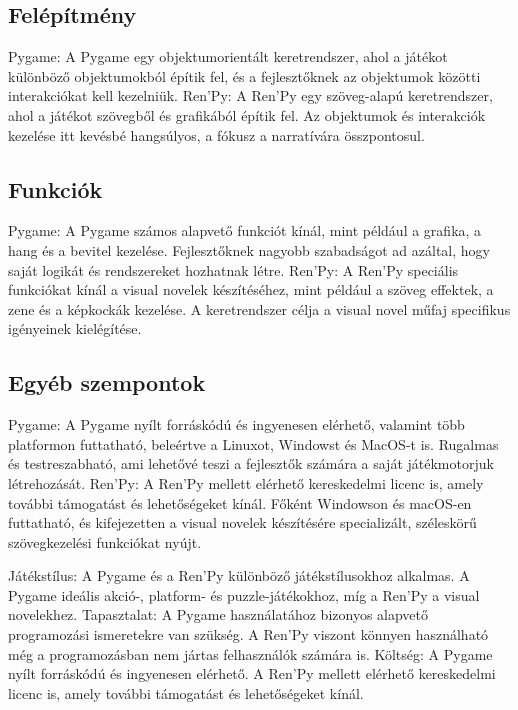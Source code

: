 \subsection{Felépítmény}

Pygame: A Pygame egy objektumorientált keretrendszer, ahol a játékot különböző objektumokból építik fel, és a fejlesztőknek az objektumok közötti interakciókat kell kezelniük.
Ren'Py: A Ren'Py egy szöveg-alapú keretrendszer, ahol a játékot szövegből és grafikából építik fel. Az objektumok és interakciók kezelése itt kevésbé hangsúlyos, a fókusz a narratívára összpontosul.

\subsection{Funkciók}

Pygame: A Pygame számos alapvető funkciót kínál, mint például a grafika, a hang és a bevitel kezelése. Fejlesztőknek nagyobb szabadságot ad azáltal, hogy saját logikát és rendszereket hozhatnak létre.
Ren'Py: A Ren'Py speciális funkciókat kínál a visual novelek készítéséhez, mint például a szöveg effektek, a zene és a képkockák kezelése. A keretrendszer célja a visual novel műfaj specifikus igényeinek kielégítése.

\subsection{Egyéb szempontok}

Pygame: A Pygame nyílt forráskódú és ingyenesen elérhető, valamint több platformon futtatható, beleértve a Linuxot, Windowst és MacOS-t is. Rugalmas és testreszabható, ami lehetővé teszi a fejlesztők számára a saját játékmotorjuk létrehozását.
Ren'Py: A Ren'Py mellett elérhető kereskedelmi licenc is, amely további támogatást és lehetőségeket kínál. Főként Windowson és macOS-en futtatható, és kifejezetten a visual novelek készítésére specializált, széleskörű szövegkezelési funkciókat nyújt.

Játékstílus: A Pygame és a Ren'Py különböző játékstílusokhoz alkalmas. A Pygame ideális akció-, platform- és puzzle-játékokhoz, míg a Ren'Py a visual novelekhez.
Tapasztalat: A Pygame használatához bizonyos alapvető programozási ismeretekre van szükség. A Ren'Py viszont könnyen használható még a programozásban nem jártas felhasználók számára is.
Költség: A Pygame nyílt forráskódú és ingyenesen elérhető. A Ren'Py mellett elérhető kereskedelmi licenc is, amely további támogatást és lehetőségeket kínál.

